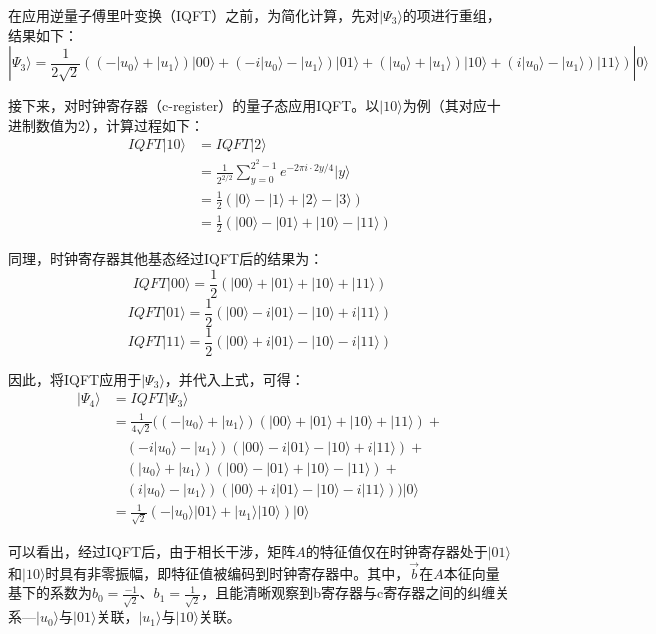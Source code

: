 \documentclass{article}
\begin{document}
在应用逆量子傅里叶变换（IQFT）之前，为简化计算，先对\(|\Psi_3\rangle\)的项进行重组，结果如下：
\[
|\Psi_3\rangle = \frac{1}{2\sqrt{2}} \left( \left(-|u_0\rangle + |u_1\rangle\right)|00\rangle + \left(-i|u_0\rangle - |u_1\rangle\right)|01\rangle + \left(|u_0\rangle + |u_1\rangle\right)|10\rangle + \left(i|u_0\rangle - |u_1\rangle\right)|11\rangle \right)|0\rangle
\]

接下来，对时钟寄存器（c-register）的量子态应用IQFT。以\(|10\rangle\)为例（其对应十进制数值为2），计算过程如下：
\[
\begin{aligned}
IQFT|10\rangle &= IQFT|2\rangle \\
&= \frac{1}{2^{2/2}} \sum_{y=0}^{2^2 - 1} e^{-2\pi i \cdot 2y / 4} |y\rangle \\
&= \frac{1}{2} \left(|0\rangle - |1\rangle + |2\rangle - |3\rangle\right) \\
&= \frac{1}{2} \left(|00\rangle - |01\rangle + |10\rangle - |11\rangle\right)
\end{aligned}
\]

同理，时钟寄存器其他基态经过IQFT后的结果为：
\[
IQFT|00\rangle = \frac{1}{2} \left(|00\rangle + |01\rangle + |10\rangle + |11\rangle\right)
\]
\[
IQFT|01\rangle = \frac{1}{2} \left(|00\rangle - i|01\rangle - |10\rangle + i|11\rangle\right)
\]
\[
IQFT|11\rangle = \frac{1}{2} \left(|00\rangle + i|01\rangle - |10\rangle - i|11\rangle\right)
\]

因此，将IQFT应用于\(|\Psi_3\rangle\)，并代入上式，可得：
\[
\begin{aligned}
|\Psi_4\rangle &= IQFT|\Psi_3\rangle \\
&= \frac{1}{4\sqrt{2}} \Bigg( \left(-|u_0\rangle + |u_1\rangle\right)\left(|00\rangle + |01\rangle + |10\rangle + |11\rangle\right) + \\
&\quad \left(-i|u_0\rangle - |u_1\rangle\right)\left(|00\rangle - i|01\rangle - |10\rangle + i|11\rangle\right) + \\
&\quad \left(|u_0\rangle + |u_1\rangle\right)\left(|00\rangle - |01\rangle + |10\rangle - |11\rangle\right) + \\
&\quad \left(i|u_0\rangle - |u_1\rangle\right)\left(|00\rangle + i|01\rangle - |10\rangle - i|11\rangle\right) \Bigg)|0\rangle \\
&= \frac{1}{\sqrt{2}} \left(-|u_0\rangle|01\rangle + |u_1\rangle|10\rangle\right)|0\rangle
\end{aligned}
\]

可以看出，经过IQFT后，由于相长干涉，矩阵\(A\)的特征值仅在时钟寄存器处于\(|01\rangle\)和\(|10\rangle\)时具有非零振幅，即特征值被编码到时钟寄存器中。其中，\(\vec{b}\)在\(A\)本征向量基下的系数为\(b_0 = \frac{-1}{\sqrt{2}}\)、\(b_1 = \frac{1}{\sqrt{2}}\)，且能清晰观察到b寄存器与c寄存器之间的纠缠关系---\(|u_0\rangle\)与\(|01\rangle\)关联，\(|u_1\rangle\)与\(|10\rangle\)关联。
\end{document}
